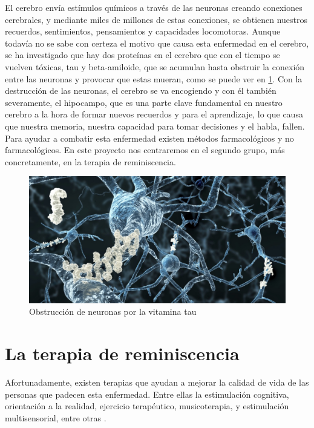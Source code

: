 El cerebro envía estímulos químicos a través de las neuronas creando conexiones cerebrales, y mediante miles de millones de estas conexiones, se obtienen nuestros recuerdos, sentimientos, pensamientos y capacidades locomotoras. Aunque todavía no se sabe con certeza el motivo que causa esta enfermedad en el cerebro, se ha investigado que hay dos proteínas en el cerebro que con el tiempo se vuelven tóxicas, tau y beta-amiloide, que se acumulan hasta obstruir la conexión entre las neuronas y provocar que estas mueran, como se puede ver en \ref{fig:tau}.  Con la destrucción de las neuronas, el cerebro se va encogiendo y con él también severamente, el hipocampo, que es una parte clave fundamental en nuestro cerebro a la hora de formar nuevos recuerdos y para el aprendizaje, lo que causa que nuestra memoria, nuestra capacidad para tomar decisiones y el habla, fallen. Para ayudar a combatir esta enfermedad existen métodos farmacológicos y no farmacológicos. En este proyecto nos centraremos en el segundo grupo, más concretamente, en la terapia de reminiscencia. \\

\begin{figure}[h]
	\centering
	\includegraphics[width = 1 \textwidth]{Imagenes/Vectorial/proteina-tau.jpg}
	\caption{Obstrucción de neuronas por la vitamina tau \citep{tau}}
	\label{fig:tau}
\end{figure}


\section{La terapia de reminiscencia}

Afortunadamente, existen terapias que ayudan a mejorar la calidad de vida de las personas que padecen esta enfermedad. Entre ellas la estimulación cognitiva, orientación a la realidad, ejercicio terapéutico, musicoterapia, y estimulación multisensorial, entre otras \citep{SAS2020}.\\

